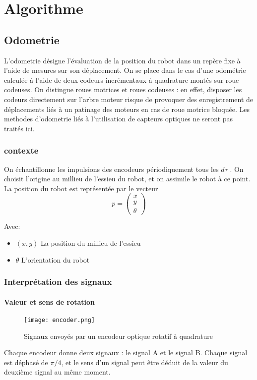 \part{Algorithme}
\chapter{Odometrie}
    L’odometrie désigne l’évaluation de la position du robot dans un repère fixe à l’aide de
    mesures sur son déplacement. On se place dans le cas d’une odométrie calculée à l’aide de deux codeurs incrémentaux à quadrature montés sur roue codeuses. On distingue roues motrices et roues codeuses : en effet, disposer les codeurs directement sur l’arbre moteur risque de provoquer des enregistrement de déplacements liés à un patinage des moteurs en cas de roue motrice bloquée. Les methodes d’odometrie liés à l’utilisation de capteurs optiques ne seront pas traités ici.

    \section{contexte}
        On échantillonne les impulsions des encodeurs périodiquement tous les $d\tau$ . On choisit l’origine au millieu de l’essieu du robot, et on assimile le robot à ce point. La position du robot est représentée par le vecteur
        \begin{equation}
            p = \begin{pmatrix}
                x\\
                y\\
                \theta
            \end{pmatrix}
        \end{equation}

        Avec:
        \begin{itemize}
            \item $(x, y)$ La position du millieu de l’essieu
            \item $\theta$ L'orientation du robot
        \end{itemize}

    \newpage
    \section{Interprétation des signaux}
        \subsection{Valeur et sens de rotation}
        \begin{figure}[h]
            \begin{center}
                \texttt{[image: encoder.png]}
            \end{center}

            \caption{Signaux envoyés par un encodeur optique rotatif à quadrature}
        \end{figure}
        Chaque encodeur donne deux signaux : le signal A et le signal B. Chaque signal est déphasé de $\pi/4$, et le sens d’un signal peut être déduit de la valeur du deuxième signal au même moment.

